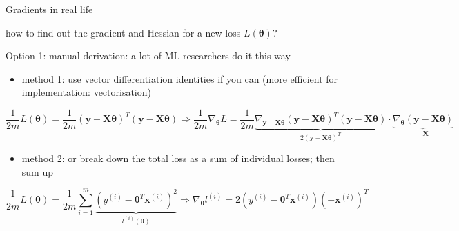 \documentclass[ignorenonframetext,aspectratio=169]{beamer}
\providecommand{\tightlist}{%
  \setlength{\itemsep}{0pt}\setlength{\parskip}{0pt}}
\newcommand{\vv}[1]{\boldsymbol{#1}}
\newcommand{\dd}[1]{\ensuremath{ #1^{(i)}}}
\newcommand{\Di}[2]{\ensuremath{ \vv{#1}^{(#2)}}}
\begin{document}
\begin{frame}{Gradients in real life}
\protect\hypertarget{gradients-in-real-life}{}

\begin{tcolorbox}[colback=green!5,colframe=green!40!black, title=A Burning Question]
\centering how to find out the gradient and Hessian for a new loss $L(\vv{\theta})$?
\end{tcolorbox}

Option 1: manual derivation: a lot of ML researchers do it this way

\footnotesize

\begin{itemize}
\tightlist
\item
  method 1: use vector differentiation identities if you can (more
  efficient for implementation: vectorisation)
\end{itemize}

\footnotesize   \[\frac{1}{2m}L(\vv{\theta})=\frac{1}{2m}(\vv{y}-\vv{X\theta})^T(\vv{y}-\vv{X\theta}) \Rightarrow  \frac{1}{2m}\nabla_{\vv{\theta}}L=\frac{1}{2m} \underbrace{\nabla_{\vv{y}-\vv{X\theta}}(\vv{y}-\vv{X\theta})^T(\vv{y}-\vv{X\theta})}_{2(\vv{y}-\vv{X\theta})^T}\cdot \underbrace{\nabla_{\vv{\theta}} (\vv{y}-\vv{X\theta})}_{-\vv{X}}\]

\begin{itemize}
\tightlist
\item
  method 2: or break down the total loss as a sum of individual losses;
  then sum up
\end{itemize}

\footnotesize  \[\frac{1}{2m}L(\vv{\theta})=\frac{1}{2m}\sum_{i=1}^m \underbrace{(\dd{y}-\vv{\theta}^T\Di{x}{i})^2}_{\dd{l}(\vv{\theta})} \Rightarrow  \nabla_{\vv{\theta}}\dd{l}=2(\dd{y}-\vv{\theta}^T\Di{x}{i})(-\Di{x}{i})^T\]

\end{frame}
\end{document}
